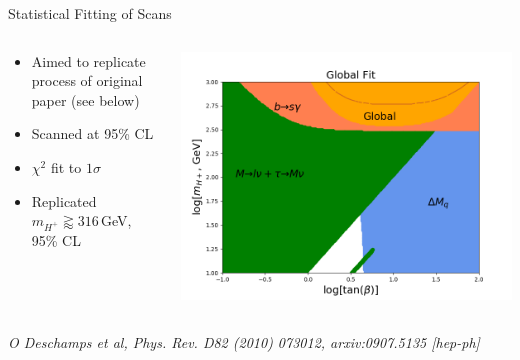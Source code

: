 \documentclass[10pt,xcolor={table,dvipsnames},t]{beamer}
\begin{document}
\begin{frame}{Statistical Fitting of Scans}
    \begin{columns}[T]
        \begin{column}{0.4\textwidth}
            \begin{itemize}
                \item Aimed to replicate process of original paper (see below) 
                \item Scanned at 95\% CL
                \item $\chi^2$ fit to $1\sigma$
                \item Replicated $m_{H^+}\gtrapprox316\,$GeV, 95\% CL
            \end{itemize}
        \end{column}
        \begin{column}{0.55\textwidth}
            \vspace{-1.5em}
            \includegraphics[scale=0.35]{global_08}
        \end{column}
    \end{columns}
    \emph{\small O Deschamps et al, Phys. Rev. D82 (2010) 073012, arxiv:0907.5135 [hep-ph]}
\end{frame}
\end{document}
